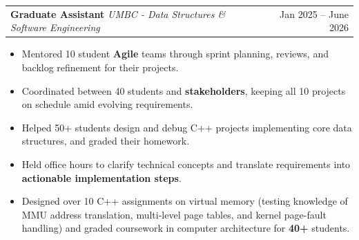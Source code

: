 \documentclass[letterpaper,11pt]{article}
\makeatletter
\newcommand{\BulletItems}[1]{
  \item
    \begin{itemize}[label={-}, leftmargin=*, labelsep=0.3em, topsep=0pt, partopsep=0pt, itemsep=0pt, parsep=0pt]
      \small #1
    \end{itemize}\vspace{-5pt}
}
\newcommand{\SLSubheadingItemThF}[3]{
  \vspace{-2pt}\item
    \begin{tabular*}{0.97\textwidth}[t]{l@{\extracolsep{\fill}}r}
      \textbf{#1} \textbar{} \textit{\small #2} & {\small #3} \\
    \end{tabular*}\vspace{-7pt}
}
\makeatother
\begin{document}
    \SLSubheadingItemThF
      {Graduate Assistant}
      {UMBC - Data Structures \& Software Engineering }
      {Jan 2025 -- June 2026}
    \BulletItems{
      \item Mentored 10 student \textbf{Agile} teams through sprint planning, reviews, and backlog refinement for their projects.
      \item Coordinated between 40 students and \textbf{stakeholders}, keeping all 10 projects on schedule amid evolving requirements.
      \item Helped 50+ students design and debug C++ projects implementing core data structures, and graded their homework.
      \item Held office hours to clarify technical concepts and translate requirements into \textbf{actionable implementation steps}.
      \item Designed over 10 C++ assignments on virtual memory (testing knowledge of MMU address translation, multi-level page tables, and kernel page-fault handling) and graded coursework in computer architecture for \textbf{40+} students.
   }
\end{document}
